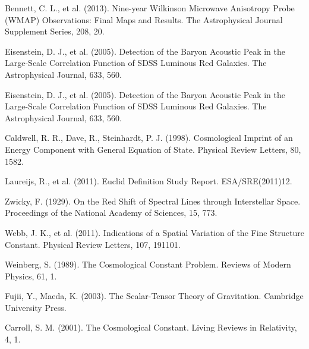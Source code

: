 \documentclass[a4paper,12pt]{article}
\begin{document}
\begin{thebibliography}{99}
		 Bennett, C. L., et al. (2013). Nine-year Wilkinson Microwave Anisotropy Probe (WMAP) Observations: Final Maps and Results. The Astrophysical Journal Supplement Series, 208, 20.
		
		 Eisenstein, D. J., et al. (2005). Detection of the Baryon Acoustic Peak in the Large-Scale Correlation Function of SDSS Luminous Red Galaxies. The Astrophysical Journal, 633, 560.
		
		 Eisenstein, D. J., et al. (2005). Detection of the Baryon Acoustic Peak in the Large-Scale Correlation Function of SDSS Luminous Red Galaxies. The Astrophysical Journal, 633, 560.
		
		 Caldwell, R. R., Dave, R., Steinhardt, P. J. (1998). Cosmological Imprint of an Energy Component with General Equation of State. Physical Review Letters, 80, 1582.
		
		 Laureijs, R., et al. (2011). Euclid Definition Study Report. ESA/SRE(2011)12.
		
		 Zwicky, F. (1929). On the Red Shift of Spectral Lines through Interstellar Space. Proceedings of the National Academy of Sciences, 15, 773.
		
		 Webb, J. K., et al. (2011). Indications of a Spatial Variation of the Fine Structure Constant. Physical Review Letters, 107, 191101.
		
		 Weinberg, S. (1989). The Cosmological Constant Problem. Reviews of Modern Physics, 61, 1.
		
		 Fujii, Y., Maeda, K. (2003). The Scalar-Tensor Theory of Gravitation. Cambridge University Press.
		
		 Carroll, S. M. (2001). The Cosmological Constant. Living Reviews in Relativity, 4, 1.
		\end{thebibliography}
	
\end{document}
